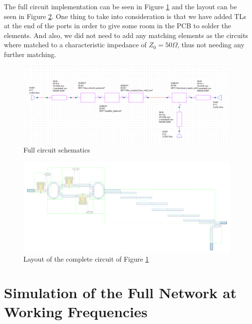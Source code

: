 \documentclass[12pt]{report} %
\let\oldsection\section
\renewcommand\section{\clearpage\oldsection}
\begin{document}
The full circuit implementation can be seen in Figure \ref{fig:integration:complete_circuit_circuit} and the layout can be seen in Figure \ref{fig:integration:complete_circuit_layout}. One thing to take into consideration is that we have added TLs at the end of the ports in order to give some room in the PCB to solder the elements. And also, we did not need to add any matching elements as the circuits where matched to a characteristic impedance of $Z_0 = 50 \Omega$, thus not needing any further matching.

\begin{figure}[htbp]
    \centering
    \includegraphics[width=1\linewidth]{images//integration/complete_circuit_circuit.png}
    \caption{Full circuit schematics}
    \label{fig:integration:complete_circuit_circuit}
\end{figure}

\begin{figure}[htbp]
    \centering
    \includegraphics[width=1\linewidth]{images//integration/complete_circuit_layout.png}
    \caption{Layout of the complete circuit of Figure \ref{fig:integration:complete_circuit_circuit}}
    \label{fig:integration:complete_circuit_layout}
\end{figure}

\section{Simulation of the Full Network at Working Frequencies}
\end{document}
